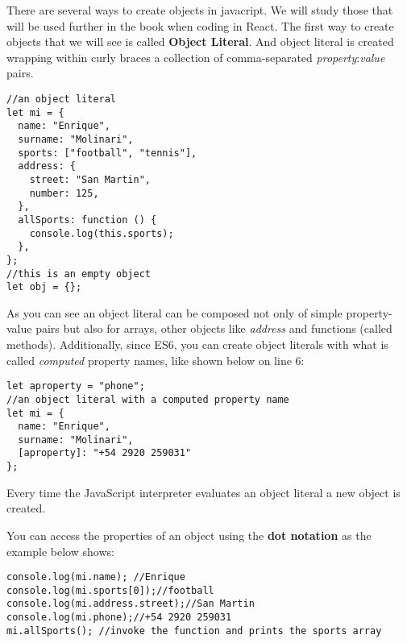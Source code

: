 \documentclass[a4paper, oneside, titlepage, 12pt]{book}
\begin{document}
There are several ways to create objects in javacript. We will study those that will be used further in the book when coding in React. The first way to create objects that we will see is called \textbf{Object Literal}. And object literal is created wrapping within curly braces a collection of comma-separated \textit{property}:\textit{value} pairs. 

\begin{verbatim}
//an object literal
let mi = {
  name: "Enrique",
  surname: "Molinari",
  sports: ["football", "tennis"],
  address: {
    street: "San Martin",
    number: 125,
  },
  allSports: function () {
    console.log(this.sports);
  },
};
//this is an empty object
let obj = {};
\end{verbatim}

As you can see an object literal can be composed not only of simple property-value pairs but also for arrays, other objects like \textit{address} and functions (called methods). Additionally, since ES6, you can create object literals with what is called \textit{computed} property names, like shown below on line 6:

\begin{verbatim}
let aproperty = "phone";               
//an object literal with a computed property name 
let mi = {
  name: "Enrique",
  surname: "Molinari",
  [aproperty]: "+54 2920 259031"
};

\end{verbatim}

Every time the JavaScript interpreter evaluates an object literal a new object is created. 

You can access the properties of an object using the \textbf{dot notation} as the example below shows:

\begin{verbatim}
console.log(mi.name); //Enrique
console.log(mi.sports[0]);//football
console.log(mi.address.street);//San Martin
console.log(mi.phone);//+54 2920 259031
mi.allSports(); //invoke the function and prints the sports array               
\end{verbatim}
\end{document}
